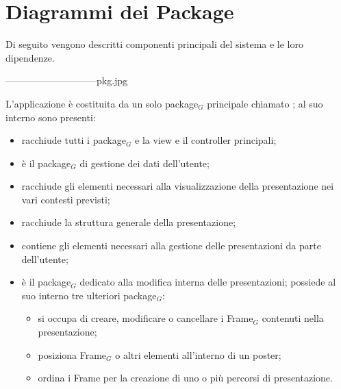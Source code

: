\section{Diagrammi dei Package}
Di seguito vengono descritti componenti principali del sistema e le loro dipendenze.

-----------------------------pkg.jpg

L'applicazione è costituita da un solo package$_G$ principale chiamato ; al suo interno sono presenti:
\begin{itemize}
\item {} racchiude tutti i package$_G$ e la view e il controller principali;
\item {} è il package$_G$ di gestione dei dati dell'utente;
\item {} racchiude gli elementi necessari alla visualizzazione della presentazione nei vari contesti previsti;
\item {} racchiude la struttura generale della presentazione;
\item {} contiene gli elementi necessari alla gestione delle presentazioni da parte dell'utente;
\item {} è il package$_G$ dedicato alla modifica interna delle presentazioni; possiede al suo interno tre ulteriori package$_G$:
\begin{itemize}
\item {} si occupa di creare, modificare o cancellare i Frame$_G$ contenuti nella presentazione;
\item {} posiziona Frame$_G$ o altri elementi all'interno di un poster;
\item {} ordina i Frame per la creazione di uno o più percorsi di presentazione.
\end{itemize}
\end{itemize}
